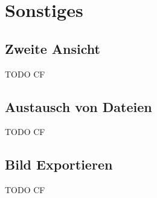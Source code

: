 \chapter{Sonstiges}

\section{Zweite Ansicht}

TODO CF

\section{Austausch von Dateien}

TODO CF

\section{Bild Exportieren}

TODO CF